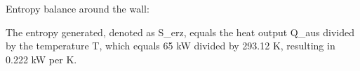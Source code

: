 Entropy balance around the wall:

The entropy generated, denoted as S_erz, equals the heat output Q_aus divided by the temperature T, which equals 65 kW divided by 293.12 K, resulting in 0.222 kW per K.